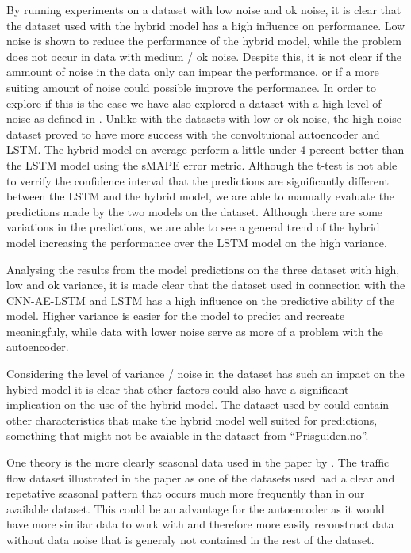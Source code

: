 By running experiments on a dataset with low noise and ok noise, it is clear that the dataset used with the hybrid model has a high influence on performance.
Low noise is shown to reduce the performance of the hybrid model, while the problem does not occur in data with medium / ok noise.
Despite this, it is not clear if the ammount of noise in the data only can impear the performance,
or if a more suiting amount of noise could possible improve the performance.
In order to explore if this is the case we have also explored a dataset with a high level of noise as defined in .
Unlike with the datasets with low or ok noise, the high noise dataset proved to have more success with the convoltuional autoencoder and LSTM.
The hybrid model on average perform a little under 4 percent better than the LSTM model using the sMAPE error metric.
Although the t-test is not able to verrify the confidence interval that the predictions are significantly different between the LSTM and the hybrid model,
we are able to manually evaluate the predictions made by the two models on the dataset.
Although there are some variations in the predictions, we are able to see a general trend of the hybrid model increasing the performance over the LSTM model on the high variance.

Analysing the results from the model predictions on the three dataset with high, low and ok variance,
it is made clear that the dataset used in connection with the CNN-AE-LSTM and LSTM
has a high influence on the predictive ability of the model.
Higher variance is easier for the model to predict and recreate meaningfuly,
while data with lower noise serve as more of a problem with the autoencoder.

Considering the level of variance / noise in the dataset has such an impact on the hybird model it
is clear that other factors could also have a significant implication on the use of the hybrid model.
The dataset used by \cite{Zhao2019} could contain other characteristics that make the hybrid model well suited for predictions,
something that might not be avaiable in the dataset from ``Prisguiden.no''.

One theory is the more clearly seasonal data used in the paper by \cite{Zhao2019}.
The traffic flow dataset illustrated in the paper as one of the datasets used had a clear and repetative seasonal
pattern that occurs much more frequently than in our available dataset.
This could be an advantage for the autoencoder as it would have more similar data to work with and therefore more easily
reconstruct data without data noise that is generaly not contained in the rest of the dataset.

